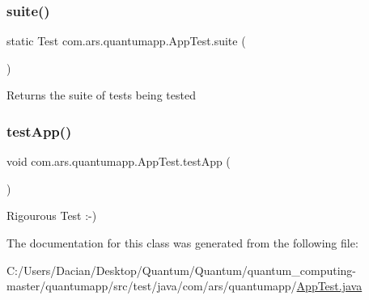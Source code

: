 \subsubsection{\texorpdfstring{suite()}{suite()}}
{\footnotesize\ttfamily static Test com.\+ars.\+quantumapp.\+App\+Test.\+suite (\begin{DoxyParamCaption}{ }\end{DoxyParamCaption})\hspace{0.3cm}{\ttfamily [static]}}

\begin{DoxyReturn}{Returns}
the suite of tests being tested 
\end{DoxyReturn}
\hypertarget{classcom_1_1ars_1_1quantumapp_1_1_app_test_a37866d2d52dc17cbba459bb947972bdd}{}\label{classcom_1_1ars_1_1quantumapp_1_1_app_test_a37866d2d52dc17cbba459bb947972bdd} 
\subsubsection{\texorpdfstring{test\+App()}{testApp()}}
{\footnotesize\ttfamily void com.\+ars.\+quantumapp.\+App\+Test.\+test\+App (\begin{DoxyParamCaption}{ }\end{DoxyParamCaption})}

Rigourous Test \+:-\/) 

The documentation for this class was generated from the following file\+:\begin{DoxyCompactItemize}
\item 
C\+:/\+Users/\+Dacian/\+Desktop/\+Quantum/\+Quantum/quantum\+\_\+computing-\/master/quantumapp/src/test/java/com/ars/quantumapp/\hyperlink{_app_test_8java}{App\+Test.\+java}\end{DoxyCompactItemize}

